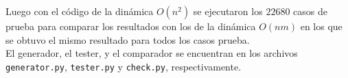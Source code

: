 \documentclass[a4paper]{article}
\begin{document}
    Luego con el c\'odigo de la din\'amica $O(n^2)$ se ejecutaron los $22680$ casos de prueba para comparar los resultados con los de la din\'amica $O(nm)$ en los que se obtuvo el mismo resultado para todos los casos prueba.\\

	El generador, el tester, y el comparador se encuentran en los archivos \texttt{generator.py}, \texttt{tester.py} y \texttt{check.py}, respectivamente.
\end{document}
